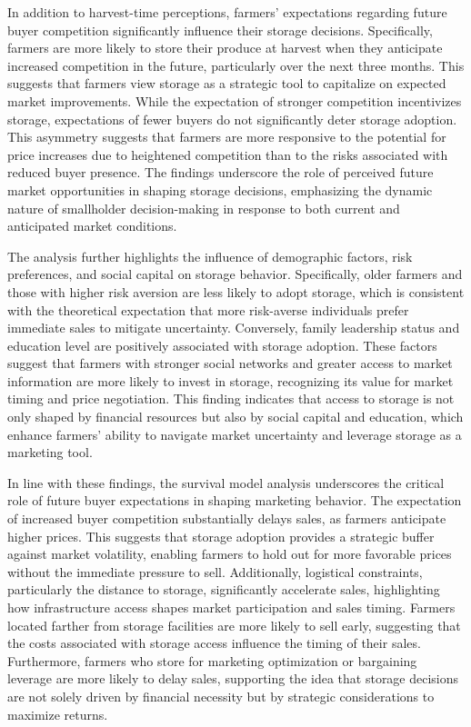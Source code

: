 In addition to harvest-time perceptions, farmers' expectations regarding future buyer competition significantly influence their storage decisions. Specifically, farmers are more likely to store their produce at harvest when they anticipate increased competition in the future, particularly over the next three months. This suggests that farmers view storage as a strategic tool to capitalize on expected market improvements. While the expectation of stronger competition incentivizes storage, expectations of fewer buyers do not significantly deter storage adoption. This asymmetry suggests that farmers are more responsive to the potential for price increases due to heightened competition than to the risks associated with reduced buyer presence. The findings underscore the role of perceived future market opportunities in shaping storage decisions, emphasizing the dynamic nature of smallholder decision-making in response to both current and anticipated market conditions.

The analysis further highlights the influence of demographic factors, risk preferences, and social capital on storage behavior. Specifically, older farmers and those with higher risk aversion are less likely to adopt storage, which is consistent with the theoretical expectation that more risk-averse individuals prefer immediate sales to mitigate uncertainty. Conversely, family leadership status and education level are positively associated with storage adoption. These factors suggest that farmers with stronger social networks and greater access to market information are more likely to invest in storage, recognizing its value for market timing and price negotiation. This finding indicates that access to storage is not only shaped by financial resources but also by social capital and education, which enhance farmers' ability to navigate market uncertainty and leverage storage as a marketing tool.

In line with these findings, the survival model analysis underscores the critical role of future buyer expectations in shaping marketing behavior. The expectation of increased buyer competition substantially delays sales, as farmers anticipate higher prices. This suggests that storage adoption provides a strategic buffer against market volatility, enabling farmers to hold out for more favorable prices without the immediate pressure to sell. Additionally, logistical constraints, particularly the distance to storage, significantly accelerate sales, highlighting how infrastructure access shapes market participation and sales timing. Farmers located farther from storage facilities are more likely to sell early, suggesting that the costs associated with storage access influence the timing of their sales. Furthermore, farmers who store for marketing optimization or bargaining leverage are more likely to delay sales, supporting the idea that storage decisions are not solely driven by financial necessity but by strategic considerations to maximize returns.
